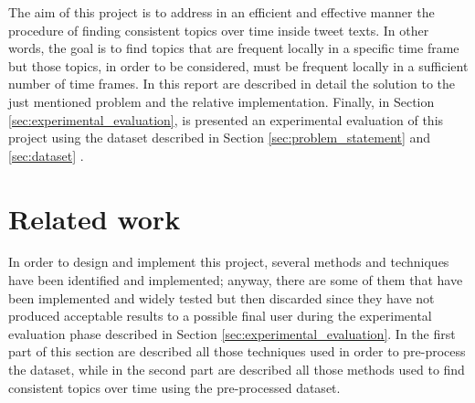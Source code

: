 The aim of this project is to address in an efficient and effective manner the procedure of finding consistent topics over time inside tweet texts. In other words, the goal is to find topics that are frequent locally in a specific time frame but those topics, in order to be considered, must be frequent locally in a sufficient number of time frames. In this report are described in detail the solution to the just mentioned problem and the relative implementation. Finally, in Section \ref{sec:experimental_evaluation}, is presented an experimental evaluation of this project using the dataset described in Section \ref{sec:problem_statement} and \ref{sec:dataset} \cite{covid19-tweets-dataset}.

\section{Related work}
\label{sec:related_word}
In order to design and implement this project, several methods and techniques have been identified and implemented; anyway, there are some of them that have been implemented and widely tested but then discarded since they have not produced acceptable results to a possible final user during the experimental evaluation phase described in Section \ref{sec:experimental_evaluation}. In the first part of this section are described all those techniques used in order to pre-process the dataset, while in the second part are described all those methods used to find consistent topics over time using the pre-processed dataset. 

